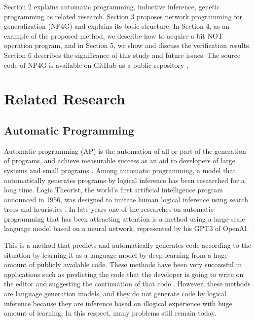 \documentclass{article}
\begin{document}
Section 2 explains automatic programming, inductive inference, genetic programming as related research.
Section 3 proposes network programming for generalization (NP4G) and explains its basic structure.
In Section 4, as an example of the proposed method, we describe how to acquire a bit NOT operation program, and in Section 5, we show and discuss the verification results.
Section 6 describes the significance of this study and future issues.
The source code of NP4G is available on GitHub as a public repository \footnotemark[1]. 

\section{Related Research}
\subsection{Automatic Programming}
\label{sec:headings}
Automatic programming (AP) is the automation of all or part of the generation of programs, and achieve measurable success as an aid to developers of large systems and small programs \cite{AutomaticProgramming}. 
Among automatic programming, a model that automatically generates programs by logical inference has been researched for a long time.
Logic Theorist, the world's first artificial intelligence program announced in 1956, was designed to imitate human logical inference using search trees and heuristics \cite{LogicTheorist}.
In late years one of the researches on automatic programming that has been attracting attention is a method using a large-scale language model based on a neural network, represented by his GPT3\cite{gpt3} of OpenAI.

This is a method that predicts and automatically generates code according to the situation by learning it as a language model by deep learning from a huge amount of publicly available code.
These methods have been very successful in applications such as predicting the code that the developer is going to write on the editor and suggesting the continuation of that code \cite{copilot}.
However, these methods are language generation models, and they do not generate code by logical inference because they are inference based on illogical experience with huge amount of learning.
In this respect, many problems still remain today.
\end{document}
